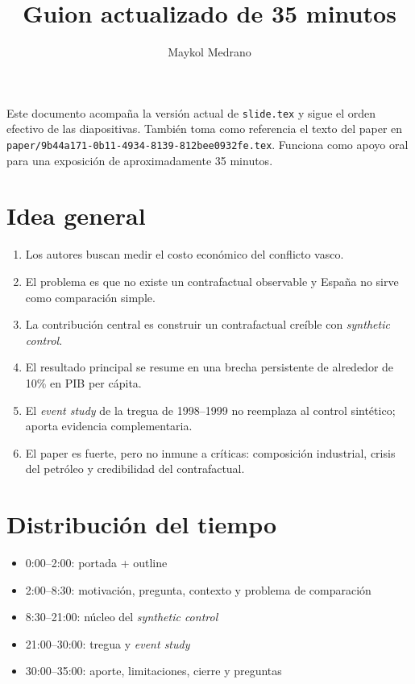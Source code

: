 \documentclass[11pt]{article}
\title{Guion actualizado de 35 minutos\\\large \papertitle}
\author{Maykol Medrano}
\date{}
\begin{document}
\maketitle

\noindent Este documento acompaña la versión actual de \texttt{slide.tex} y sigue el orden efectivo de las diapositivas. También toma como referencia el texto del paper en \texttt{paper/9b44a171-0b11-4934-8139-812bee0932fe.tex}. Funciona como apoyo oral para una exposición de aproximadamente 35 minutos.

\section*{Idea general}

\begin{enumerate}
    \item Los autores buscan medir el costo económico del conflicto vasco.
    \item El problema es que no existe un contrafactual observable y España no sirve como comparación simple.
    \item La contribución central es construir un contrafactual creíble con \emph{synthetic control}.
    \item El resultado principal se resume en una brecha persistente de alrededor de 10\% en PIB per cápita.
    \item El \emph{event study} de la tregua de 1998--1999 no reemplaza al control sintético; aporta evidencia complementaria.
    \item El paper es fuerte, pero no inmune a críticas: composición industrial, crisis del petróleo y credibilidad del contrafactual.
\end{enumerate}

\section*{Distribución del tiempo}

\begin{itemize}
    \item 0:00--2:00: portada + outline
    \item 2:00--8:30: motivación, pregunta, contexto y problema de comparación
    \item 8:30--21:00: núcleo del \emph{synthetic control}
    \item 21:00--30:00: tregua y \emph{event study}
    \item 30:00--35:00: aporte, limitaciones, cierre y preguntas
\end{itemize}
\end{document}
